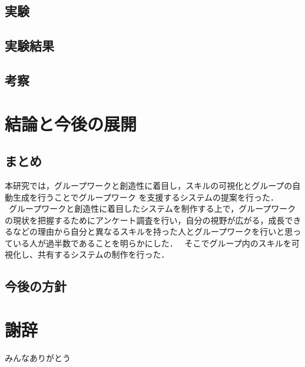 \documentclass{funthesis}
\begin{document}
\section{実験}

\section{実験結果}




\section{考察}



\chapter{結論と今後の展開}
\section{まとめ}
本研究では，グループワークと創造性に着目し，スキルの可視化とグループの自動生成を行うことでグループワーク
を支援するシステムの提案を行った．\\
\ グループワークと創造性に着目したシステムを制作する上で，グループワークの現状を把握するためにアンケート調査を行い，自分の視野が広がる，成長できるなどの理由から自分と異なるスキルを持った人とグループワークを行いと思っている人が過半数であることを明らかにした．
\ そこでグループ内のスキルを可視化し、共有するシステムの制作を行った．

\section{今後の方針}


\chapter*{謝辞}

みんなありがとう
\end{document}
